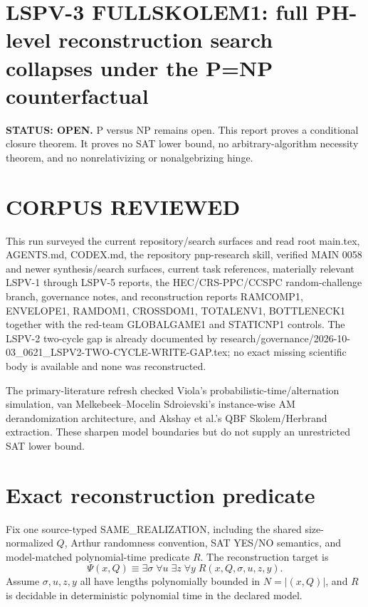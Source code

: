\documentclass[11pt]{article}
\begin{document}
\section*{LSPV-3 FULLSKOLEM1: full PH-level reconstruction search collapses under the P=NP counterfactual}
\textbf{STATUS: OPEN.} P versus NP remains open. This report proves a conditional closure theorem. It proves no SAT lower bound, no arbitrary-algorithm necessity theorem, and no nonrelativizing or nonalgebrizing hinge.

\section*{CORPUS REVIEWED}
This run surveyed the current repository/search surfaces and read root main.tex, AGENTS.md, CODEX.md, the repository pnp-research skill, verified MAIN 0058 and newer synthesis/search surfaces, current task references, materially relevant LSPV-1 through LSPV-5 reports, the HEC/CRS-PPC/CCSPC random-challenge branch, governance notes, and reconstruction reports RAMCOMP1, ENVELOPE1, RAMDOM1, CROSSDOM1, TOTALENV1, BOTTLENECK1 together with the red-team GLOBALGAME1 and STATICNP1 controls. The LSPV-2 two-cycle gap is already documented by research/governance/2026-10-03_0621_LSPV2-TWO-CYCLE-WRITE-GAP.tex; no exact missing scientific body is available and none was reconstructed.

The primary-literature refresh checked Viola's probabilistic-time/alternation simulation, van Melkebeek--Mocelin Sdroievski's instance-wise AM derandomization architecture, and Akshay et al.'s QBF Skolem/Herbrand extraction. These sharpen model boundaries but do not supply an unrestricted SAT lower bound.

\section*{Exact reconstruction predicate}
Fix one source-typed SAME\_REALIZATION, including the shared size-normalized \(Q\), Arthur randomness convention, SAT YES/NO semantics, and model-matched polynomial-time predicate \(R\). The reconstruction target is
\[
\Psi(x,Q)\equiv
\exists \sigma\;\forall u\;\exists z\;\forall y\;
R(x,Q,\sigma,u,z,y).
\]
Assume \(\sigma,u,z,y\) all have lengths polynomially bounded in \(N=|(x,Q)|\), and \(R\) is decidable in deterministic polynomial time in the declared model.
\end{document}
